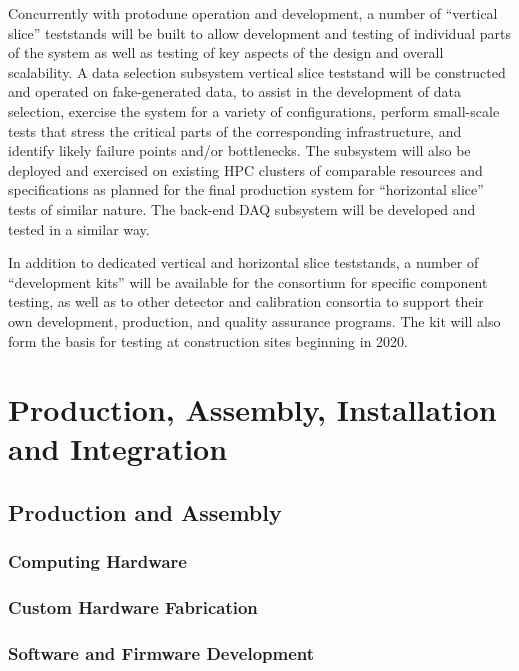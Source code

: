Concurrently with protodune operation and development, a number of
``vertical slice'' teststands will be built to allow 
development and testing of individual parts of the  system
as well as testing of key aspects of the design and overall
scalability. A data selection subsystem vertical slice teststand will be
constructed and operated on fake-generated data, to assist in the
development of data selection, exercise the system for a variety of
configurations, perform small-scale tests that stress the critical
parts of the corresponding infrastructure, 
and identify likely failure points and/or bottlenecks. The subsystem
will also be deployed and exercised on existing HPC clusters of
comparable resources and specifications as planned for the final
production system for ``horizontal slice'' tests of similar nature. The
back-end DAQ subsystem will be developed and tested in a similar way.

In addition to dedicated vertical and horizontal slice teststands, a number of
 ``development kits'' will be available for the consortium for
specific component testing, as well as to other detector and
calibration consortia to support their own development, production, and quality assurance programs. The  
kit will also form the basis for testing at construction sites beginning in 2020. 

\section{Production, Assembly, Installation and Integration}
\label{sec:daq:production}


\subsection{Production and Assembly}

\subsubsection{Computing Hardware}

\subsubsection{Custom Hardware Fabrication}

\subsubsection{Software and Firmware Development}

